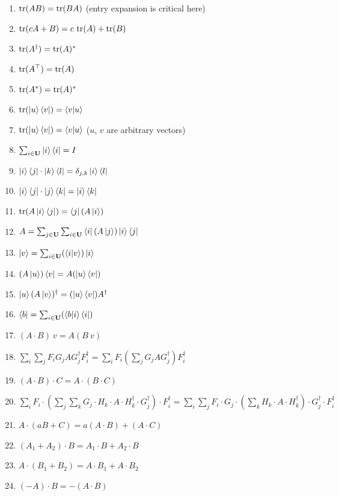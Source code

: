 \documentclass[manuscript, review, timestamp]{acmart}
\begin{document}
\begin{enumerate}
  \item \pass $\mathrm{tr}(A B) = \mathrm{tr}(B A)$ (entry expansion is critical here)
  \item \pass $\mathrm{tr}(c A + B) = c\ \mathrm{tr}(A) + \mathrm{tr}(B)$
  \item \pass $\mathrm{tr}(A^\dagger) = \mathrm{tr}(A)^*$
  \item \pass $\mathrm{tr}(A^\top) = \mathrm{tr}(A)$
  \item \pass $\mathrm{tr}(A^*) = \mathrm{tr}(A)^*$
  \item \pass $\mathrm{tr}(\ket{u}\bra{v}) = \braket{v|u}$
  \item \pass $\mathrm{tr}(\ket{u}\bra{v}) = \braket{v|u}$ ($u$, $v$ are arbitrary vectors)
  \item \pass $\sum_{i\in\mathbf{U}} \ket{i}\bra{i} = I$
  \item \pass $\ket{i}\bra{j}\cdot\ket{k}\bra{l} = \delta_{j,k}\ket{i}\bra{l}$
  \item \pass $\ket{i}\bra{j}\cdot\ket{j}\bra{k} = \ket{i}\bra{k}$
  \item \pass $\mathrm{tr}(A \ket{i}\bra{j}) = \bra{j} (A \ket{i})$
  \item \pass $A = \sum_{j\in\mathbf{U}}\sum_{i\in\mathbf{U}} \bra{i}(A\ket{j}) \ket{i}\bra{j}$
  \item \pass $\ket{v} = \sum_{i\in\mathbf{U}}(\braket{i|v})\ket{i}$
  \item \pass $(A\ket{u})\bra{v} = A(\ket{u}\bra{v})$
  \item \pass $\ket{u}(A\ket{v})^\dagger = (\ket{u}\bra{v})A^\dagger$
  \item \pass $\bra{b} = \sum_{i\in\mathbf{U}}(\braket{b|i}\bra{i})$
  \item \pass $(A\cdot B)\ v = A (B\ v)$
  \item \pass $\sum_{i}\sum_{j}F_i G_j A G_j^\dagger F_i^\dagger = \sum_i F_i (\sum_j G_j A G_j^\dagger) F_i^\dagger$
  \item \pass $(A\cdot B)\cdot C = A \cdot (B \cdot C)$
  \item \pass $\sum_i F_i \cdot (\sum_j \sum_k G_j \cdot H_k \cdot A \cdot H_k^\dagger \cdot G_j^\dagger) \cdot F_i^\dagger = \sum_i \sum_j F_i \cdot G_j \cdot (\sum_k H_k \cdot A \cdot H_k^\dagger) \cdot G_j^\dagger \cdot F_i^\dagger$
  \item \pass $A\cdot(a B + C) = a (A\cdot B) + (A\cdot C)$
  \item \pass $(A_1 + A_2)\cdot B = A_1 \cdot B + A_2 \cdot B$
  \item \pass $A \cdot (B_1 + B_2) = A \cdot B_1 + A \cdot B_2$
  \item \pass $(-A) \cdot B = - (A \cdot B)$

\end{enumerate}
\end{document}
